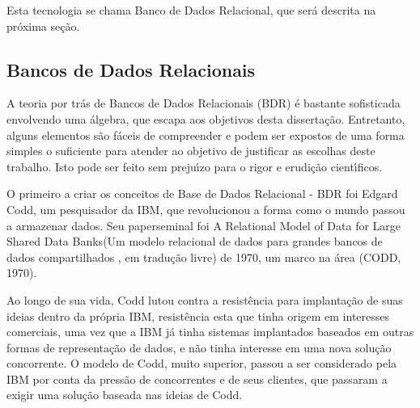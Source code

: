 \documentclass[
12pt,		%
openright,	%
twoside,  %
a4paper,			%
chapter=TITLE,		%
english,			%
french,				%
spanish,			%
brazil				%
]{USPSC-classe/USPSC}
\begin{document}
Esta tecnologia se chama \textquotedbl Banco de Dados Relacional\textquotedbl , que ser\'a descrita na pr\'oxima se\c{c}\~ao.

















\subsection[Bancos de Dados Relacionais]{Bancos de Dados Relacionais}\label{Bancos de Dados Relacionais}
A teoria por tr\'as de Bancos de Dados Relacionais (BDR) \'e bastante sofisticada envolvendo uma \'algebra, que escapa aos objetivos desta disserta\c{c}\~ao. Entretanto, alguns elementos s\~ao f\'aceis de compreender e podem ser expostos  de uma forma simples o suficiente para atender ao objetivo de justificar as escolhas deste trabalho. Isto pode ser feito sem preju\'{\i}zo para o rigor e erudi\c{c}\~ao cient\'{\i}ficos.

















O primeiro a criar os conceitos de Base de Dados Relacional - BDR foi Edgard Codd, um pesquisador da IBM, que revolucionou a forma como o mundo passou a armazenar dados. Seu \textquotedbl paper\textquotedbl  seminal foi  \textquotedbl A Relational Model of Data for Large Shared Data Banks\textquotedbl  (\textquotedbl Um modelo relacional de dados para grandes bancos de dados compartilhados \textquotedbl , em tradu\c{c}\~ao livre) de 1970, um marco na \'area (CODD, 1970).

















Ao longo de sua vida, Codd lutou contra a resist\^encia para implanta\c{c}\~ao de suas ideias dentro da pr\'opria IBM, resist\^encia esta que tinha origem em interesses comerciais, uma vez que a IBM j\'a tinha sistemas implantados baseados em outras formas de representa\c{c}\~ao de dados, e n\~ao tinha interesse em uma nova solu\c{c}\~ao concorrente. O modelo de Codd, muito superior, passou a ser considerado pela IBM por conta da press\~ao de concorrentes e de seus clientes, que passaram a exigir uma solu\c{c}\~ao baseada nas ideias de Codd.
\end{document}
